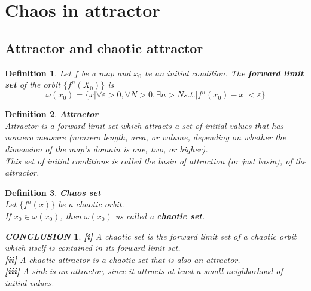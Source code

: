 \documentclass[12pt]{article}
\theoremstyle{plain}
\newtheorem{definition}{{\color{red}\textbf{Definition}}}[section]
\newtheorem{conclusion}{\textit{\textbf{CONCLUSION}}}[section]
\begin{document}
\newpage
\section{Chaos in attractor}


\subsection{Attractor and chaotic attractor}

\begin{definition} Let $f$ be a map and $x_0$ be an initial condition. The \textbf{forward limit set} of the orbit $\{f^n(X_0)\}$ is 
$$
\omega(x_0) = \{x| \forall \varepsilon > 0, \forall N > 0, \exists n > N s.t. |f^n(x_0) - x| < \varepsilon\}
$$
\end{definition}


\begin{definition}\textbf{Attractor}
\\\noindent Attractor is a forward limit set which attracts a set of initial values that has nonzero measure (nonzero length, area, or volume, depending on whether the dimension of the map’s domain is one, two, or higher). 
\\\noindent This set of initial conditions is called the basin of attraction (or just basin), of the attractor.
\end{definition}


\begin{definition} \textbf{Chaos set}
\\\noindent Let $\{f^n(x)\}$ be a chaotic orbit. 
\\\noindent If $x_0 \in \omega(x_0)$, then $\omega(x_0)$ us called a \textbf{chaotic set}.
\end{definition}


\begin{conclusion}\label{prop-chaos-attractor} \textbf{[i]} A chaotic set is the forward limit set of a chaotic orbit which itself is contained in its forward limit set.
\\\noindent \textbf{[ii]} A chaotic attractor is a chaotic set that is also an attractor.
\\\noindent \textbf{[iii]} A sink is an attractor, since it attracts at least a small neighborhood of initial values.
\end{conclusion}
\end{document}
